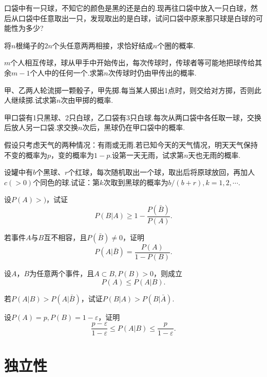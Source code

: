 \begin{xiti}
  \item 口袋中有一只球，不知它的颜色是黑的还是白的.现再往口袋中放入一只白球，然后从口袋中任意取出一只，发现取出的是白球，试问口袋中原来那只球是白球的可能性为多少?

  \item 将$n$根绳子的$2n$个头任意两两相接，求恰好结成$n$个圈的概率.

  \item $m$个人相互传球，球从甲手中开始传出，每次传球时，传球者等可能地把球传给其余$m-1$个人中的任何一个.求第$n$次传球时仍由甲传出的概率.

  \item 甲、乙两人轮流掷一颗骰子，甲先掷.每当某人掷出1点时，则交给对方掷，否则此人继续掷.试求第$n$次由甲掷的概率.

  \item 甲口袋有1只黑球、2只白球，乙口袋有3只白球.每次从两口袋中各任取一球，交换后放人另一口袋.求交换$n$次后，黑球仍在甲口袋中的概率.

  \item 假设只考虑天气的两种情况：有雨或无雨.若已知今天的天气情况，明天天气保持不变的概率为$p$，变的概率为$1-p$.设第一天无雨，试求第$n$天也无雨的概率.

  \item 设罐中有$b$个黑球、$r$个红球，每次随机取出一个球，取出后将原球放回，再加人$c(>0)$个同色的球.试证：第$k$次取到黑球的概率为$b/(b+r),k=1,2,\cdots$.

  \item 设$P(A)>)$，试证
    \[
      P(B|A) \ge 1 - \frac{P(\bar B)}{P(A)}.
    \]

  \item 若事件$A$与$B$互不相容，且$P(\bar B)\ne0$，证明
    \[
      P(A|\bar B) = \frac{P(A)}{1-P(B)}.
    \]

  \item 设$A$，$B$为任意两个事件，且$A\subset B,P(B)>0$，则成立
    \[
      P(A) \le P(A|B).
    \]

  \item 若$P(A|B)>P(A|\bar B)$，试证$P(B|A)>P(B|\bar A)$.

  \item 设$P(A)=p,P(B)=1-\varepsilon$，证明
    \[
      \frac{p-\varepsilon}{1-\varepsilon} \le P(A|B) \le \frac p{1-\varepsilon}.
    \]
\end{xiti}


\section{独立性}

